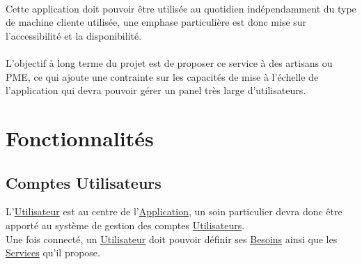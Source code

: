 \documentclass[french]{article}
\begin{document}
		\paragraph{}
			Cette application doit pouvoir être utilisée au quotidien indépendamment
			 du type de machine cliente utilisée, une emphase particulière est donc
			 mise sur l’accessibilité et la disponibilité.
		\paragraph{}
			L’objectif à long terme du projet est de proposer ce service à des
			 artisans ou PME, ce qui ajoute une contrainte sur les capacités de mise à
			 l’échelle de l’application qui devra pouvoir gérer un panel très large
			 d’utilisateurs.
			
	\newpage
	\section{Fonctionnalités}
		\localtableofcontents
		
		\newpage
		\subsection{Comptes Utilisateurs}
			
			L’\hyperlink{utilisateur}{Utilisateur} est au centre de
			 l’\hyperlink{application}{Application}, un soin particulier devra donc
			 être apporté au système de gestion des comptes
			 \hyperlink{utilisateur}{Utilisateurs}.\\
			Une fois connecté, un \hyperlink{utilisateur}{Utilisateur} doit pouvoir
			 définir ses \hyperlink{besoin}{Besoins} ainsi que les
			 \hyperlink{service}{Services} qu’il propose.\\
			
\end{document}
